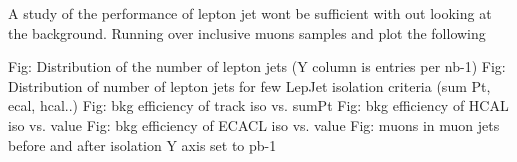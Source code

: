 A study of the performance of lepton jet wont be sufficient with out looking at the background.
Running over inclusive muons samples and plot the following

Fig: Distribution of the number of lepton jets (Y column is entries per nb-1)
Fig: Distribution of number of lepton jets for few LepJet isolation criteria (sum Pt, ecal, hcal..)
Fig: bkg efficiency of track iso vs. sumPt
Fig: bkg efficiency of HCAL iso vs. value
Fig: bkg efficiency of ECACL iso vs. value
Fig:  muons in muon jets before and after isolation
Y axis set to pb-1




